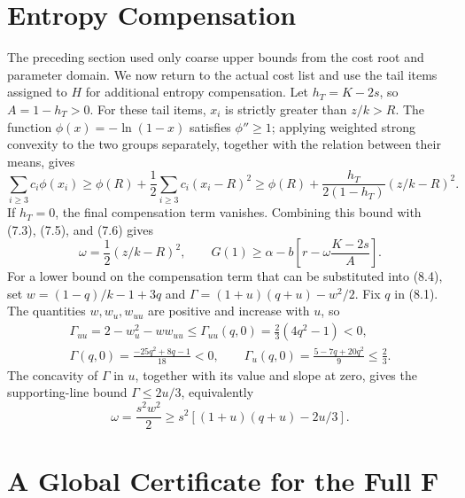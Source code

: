 \documentclass[11pt,a4paper]{article}
\begin{document}
\section{Entropy Compensation}

The preceding section used only coarse upper bounds from the cost root and parameter domain. We now return to the actual cost list and use the tail items assigned to $H$ for additional entropy compensation. Let $h_T=K-2s$, so $A=1-h_T>0$. For these tail items, $x_i$ is strictly greater than $z/k>R$. The function $\phi(x)=-\ln(1-x)$ satisfies $\phi''\ge1$; applying weighted strong convexity to the two groups separately, together with the relation between their means, gives
\[
\sum_{i\ge3}c_i\phi(x_i)
\ge\phi(R)+\frac12\sum_{i\ge3}c_i(x_i-R)^2
\ge\phi(R)+\frac{h_T}{2(1-h_T)}(z/k-R)^2.
\]
If $h_T=0$, the final compensation term vanishes. Combining this bound with (7.3), (7.5), and (7.6) gives
\begin{equation}
\omega=\frac12(z/k-R)^2,\qquad
G(1)\ge\alpha-b\left[r-\omega\frac{K-2s}{A}\right].
\tag{9.1}
\end{equation}
For a lower bound on the compensation term that can be substituted into (8.4), set $w=(1-q)/k-1+3q$ and $\Gamma=(1+u)(q+u)-w^2/2$. Fix $q$ in (8.1). The quantities $w,w_u,w_{uu}$ are positive and increase with $u$, so
\[
\begin{gathered}
\Gamma_{uu}=2-w_u^2-ww_{uu}\le\Gamma_{uu}(q,0)=\frac23(4q^2-1)<0,\\
\Gamma(q,0)=\frac{-25q^2+8q-1}{18}<0,\qquad
\Gamma_u(q,0)=\frac{5-7q+20q^2}{9}\le\frac23.
\end{gathered}
\]
The concavity of $\Gamma$ in $u$, together with its value and slope at zero, gives the supporting-line bound $\Gamma\le2u/3$, equivalently
\begin{equation}
\omega=\frac{s^2w^2}{2}\ge s^2[(1+u)(q+u)-2u/3].
\tag{9.2}
\end{equation}

\section{A Global Certificate for the Full F}
\end{document}
